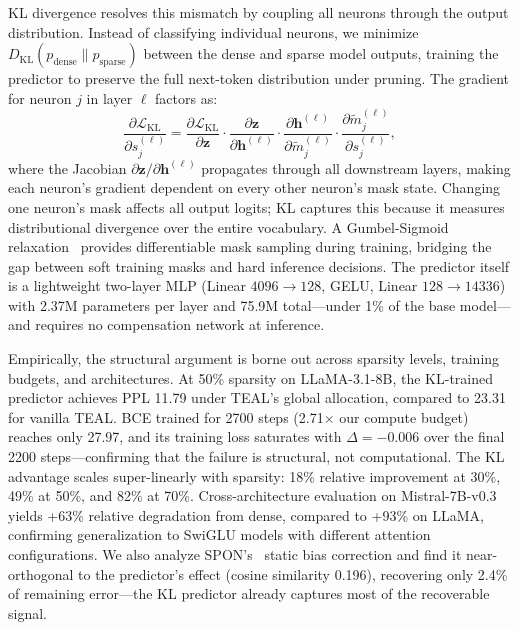 KL divergence resolves this mismatch by coupling all neurons through the output distribution.
Instead of classifying individual neurons, we minimize $D_{\text{KL}}(p_{\text{dense}} \| p_{\text{sparse}})$ between the dense and sparse model outputs, training the predictor to preserve the full next-token distribution under pruning.
The gradient for neuron $j$ in layer $\ell$ factors as:
\begin{equation*}
\frac{\partial \mathcal{L}_{\text{KL}}}{\partial s_j^{(\ell)}} = \frac{\partial \mathcal{L}_{\text{KL}}}{\partial \mathbf{z}} \cdot \frac{\partial \mathbf{z}}{\partial \mathbf{h}^{(\ell)}} \cdot \frac{\partial \mathbf{h}^{(\ell)}}{\partial \tilde{m}_j^{(\ell)}} \cdot \frac{\partial \tilde{m}_j^{(\ell)}}{\partial s_j^{(\ell)}},
\end{equation*}
where the Jacobian $\partial \mathbf{z} / \partial \mathbf{h}^{(\ell)}$ propagates through all downstream layers, making each neuron's gradient dependent on every other neuron's mask state.
Changing one neuron's mask affects all output logits; KL captures this because it measures distributional divergence over the entire vocabulary.
A Gumbel-Sigmoid relaxation~\cite{jang2017gumbel} provides differentiable mask sampling during training, bridging the gap between soft training masks and hard inference decisions.
The predictor itself is a lightweight two-layer MLP (Linear $4096 \to 128$, GELU, Linear $128 \to 14336$) with 2.37M parameters per layer and 75.9M total---under 1\% of the base model---and requires no compensation network at inference.

Empirically, the structural argument is borne out across sparsity levels, training budgets, and architectures.
At 50\% sparsity on LLaMA-3.1-8B, the KL-trained predictor achieves PPL 11.79 under TEAL's global allocation, compared to 23.31 for vanilla TEAL.
BCE trained for 2700 steps (2.71$\times$ our compute budget) reaches only 27.97, and its training loss saturates with $\Delta = -0.006$ over the final 2200 steps---confirming that the failure is structural, not computational.
The KL advantage scales super-linearly with sparsity: 18\% relative improvement at 30\%, 49\% at 50\%, and 82\% at 70\%.
Cross-architecture evaluation on Mistral-7B-v0.3~\cite{jiang2023mistral} yields +63\% relative degradation from dense, compared to +93\% on LLaMA, confirming generalization to SwiGLU models with different attention configurations.
We also analyze SPON's~\cite{xu2026spon} static bias correction and find it near-orthogonal to the predictor's effect (cosine similarity 0.196), recovering only 2.4\% of remaining error---the KL predictor already captures most of the recoverable signal.

